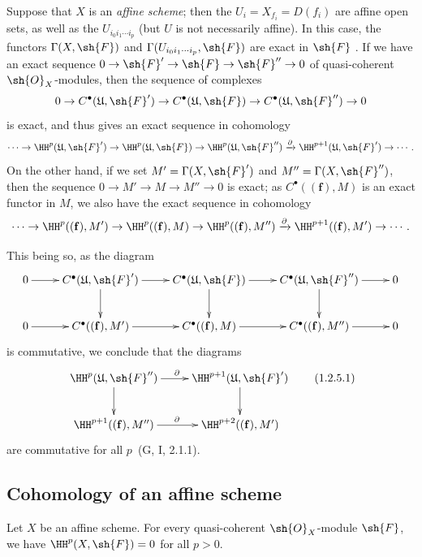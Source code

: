 \begin{remark}[1.2.5]
\label{III.1.2.5}
Suppose that $X$ is an \emph{affine scheme}; then the $U_i=X_{f_i}=D(f_i)$ are affine open sets, as well as the $U_{i_0 i_1\cdots i_p}$ (but $U$ is not necessarily affine).
In this case, the functors $\Gamma(X,\sh{F})$ and $\Gamma(U_{i_0 i_1\cdots i_p},\sh{F})$ are exact in $\sh{F}$ .
If we have an exact sequence $0\to\sh{F}'\to\sh{F}\to\sh{F}''\to 0$ of quasi-coherent $\sh{O}_X$-modules, then the sequence of complexes
\[
  0\to C^\bullet(\mathfrak{U},\sh{F}')\to C^\bullet(\mathfrak{U},\sh{F})\to C^\bullet(\mathfrak{U},\sh{F}'')\to 0
\]
is exact, and thus gives an exact sequence in cohomology
\[
  \cdots\to\HH^p(\mathfrak{U},\sh{F}')\to\HH^p(\mathfrak{U},\sh{F})\to\HH^p(\mathfrak{U},\sh{F}'')\xrightarrow{\partial}\HH^{p+1}(\mathfrak{U},\sh{F}')\to\cdots.
\]
On the other hand, if we set $M'=\Gamma(X,\sh{F}')$ and $M''=\Gamma(X,\sh{F}'')$, then the sequence $0\to M'\to M\to M''\to 0$ is exact; as $C^\bullet((\mathbf{f}),M)$ is an exact functor in $M$, we also have the exact sequence in cohomology
\[
  \cdots\to\HH^p((\mathbf{f}),M')\to\HH^p((\mathbf{f}),M)\to\HH^p((\mathbf{f}),M'')\xrightarrow{\partial}\HH^{p+1}((\mathbf{f}),M')\to\cdots.
\]

This being so, as the diagram
\[
  \xymatrix{
    0\ar[r] &
    C^\bullet(\mathfrak{U},\sh{F}')\ar[r]\ar[d] &
    C^\bullet(\mathfrak{U},\sh{F})\ar[r]\ar[d] &
    C^\bullet(\mathfrak{U},\sh{F}'')\ar[r]\ar[d] &
    0\\
    0\ar[r] &
    C^\bullet((\mathbf{f}),M')\ar[r] &
    C^\bullet((\mathbf{f}),M)\ar[r] &
    C^\bullet((\mathbf{f}),M'')\ar[r] &
    0
  }
\]
is commutative, we conclude that the diagrams
\[
  \xymatrix{
    \HH^p(\mathfrak{U},\sh{F}'')\ar[r]^\partial\ar[d] &
    \HH^{p+1}(\mathfrak{U},\sh{F}')\ar[d]\\
    \HH^{p+1}((\mathbf{f}),M'')\ar[r]^\partial &
    \HH^{p+2}((\mathbf{f}),M')
  }
  \tag{1.2.5.1}
\]
are commutative for all $p$~(G, I, 2.1.1).
\end{remark}

\subsection{Cohomology of an affine scheme}
\label{subsection:III.1.3}

\begin{theorem}[1.3.1]
\label{III.1.3.1}
Let $X$ be an affine scheme.
For every quasi-coherent $\sh{O}_X$-module $\sh{F}$, we have $\HH^p(X,\sh{F})=0$ for all $p>0$.
\end{theorem}


